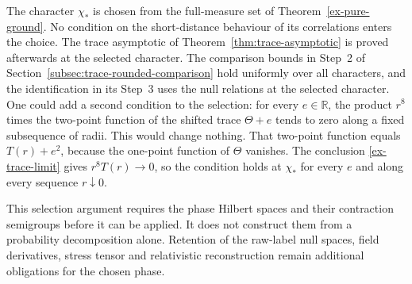 \begin{remark}
\label{rem:ex-selection-ground-only}
The character \(\chi_*\) is chosen from the full-measure set of
Theorem~\ref{ex-pure-ground}. No condition on the short-distance
behaviour of its correlations enters the choice. The trace asymptotic of
Theorem~\ref{thm:trace-asymptotic} is proved afterwards at the selected
character. The comparison bounds in Step~2 of
Section~\ref{subsec:trace-rounded-comparison} hold uniformly over all
characters, and the identification in its Step~3 uses the null relations at
the selected character. One could add a second condition to the selection:
for every \(e\in\mathbb R\), the product \(r^8\) times the two-point function
of the shifted trace \(\Theta+e\) tends to zero along a fixed subsequence of
radii. This would change nothing. That two-point function equals
\(T(r)+e^2\), because the one-point function of \(\Theta\) vanishes. The
conclusion \eqref{ex-trace-limit} gives \(r^8T(r)\to0\), so the condition
holds at \(\chi_*\) for every \(e\) and along every sequence \(r\downarrow0\).
\end{remark}

This selection argument requires the phase Hilbert spaces and their
contraction semigroups before it can be applied. It does not construct
them from a probability decomposition alone. Retention of the raw-label
null spaces, field derivatives, stress tensor and relativistic
reconstruction remain additional obligations for the chosen phase.
